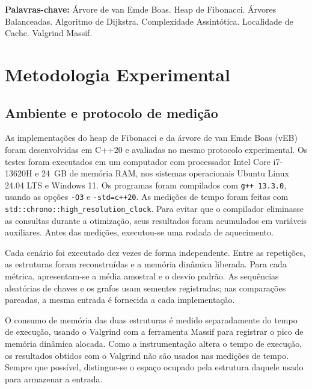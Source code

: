 \documentclass[12pt,a4paper]{report}
\begin{document}
\noindent\textbf{Palavras-chave:} Árvore de van Emde Boas. Heap de Fibonacci. Árvores Balanceadas. Algoritmo de Dijkstra. Complexidade Assintótica. Localidade de Cache. Valgrind Massif.

\newpage
\tableofcontents
\newpage

\chapter{Metodologia Experimental}
\label{cap:estudo_caso}

\section{Ambiente e protocolo de medição}

As implementações do heap de Fibonacci e da árvore de van Emde Boas (vEB) foram desenvolvidas em C++20 e avaliadas no mesmo protocolo experimental. Os testes foram executados em um computador com processador Intel Core i7-13620H e 24~GB de memória RAM, nos sistemas operacionais Ubuntu Linux 24.04 LTS e Windows 11. Os programas foram compilados com \texttt{g++ 13.3.0}, usando as opções \texttt{-O3} e \texttt{-std=c++20}. As medições de tempo foram feitas com \texttt{std::chrono::high\_resolution\_clock}. Para evitar que o compilador eliminasse as consultas durante a otimização, seus resultados foram acumulados em variáveis auxiliares. Antes das medições, executou-se uma rodada de aquecimento.

Cada cenário foi executado dez vezes de forma independente. Entre as repetições, as estruturas foram reconstruídas e a memória dinâmica liberada. Para cada métrica, apresentam-se a média amostral e o desvio padrão. As sequências aleatórias de chaves e os grafos usam sementes registradas; nas comparações pareadas, a mesma entrada é fornecida a cada implementação.

O consumo de memória das duas estruturas é medido separadamente do tempo de execução, usando o Valgrind com a ferramenta Massif para registrar o pico de memória dinâmica alocada. Como a instrumentação altera o tempo de execução, os resultados obtidos com o Valgrind não são usados nas medições de tempo. Sempre que possível, distingue-se o espaço ocupado pela estrutura daquele usado para armazenar a entrada.
\end{document}
